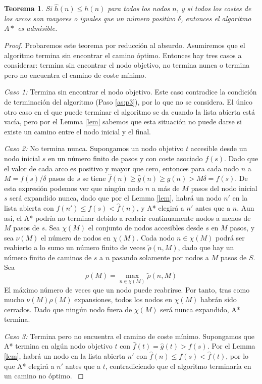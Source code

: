 \documentclass[a4paper,12pt]{article}
\newtheorem{thm}{Teorema}
\newenvironment{case1}{\textit{Caso 1:}}{}
\newenvironment{case2}{\textit{Caso 2:}}{}
\newenvironment{case3}{\textit{Caso 3:}}{}
\begin{document}
\begin{thm}\label{thm1}
Si $\hat{h}(n) \leq h(n)$ para todos los nodos $n$, y si todos los costes de los arcos son mayores o iguales que un número positivo $\delta$, entonces el algoritmo $A*$ es admisible.
\end{thm}

\begin{proof}
Probaremos este teorema por reducción al absurdo. Asumiremos que el algoritmo termina sin encontrar el camino óptimo. Entonces hay tres casos a considerar: termina sin encontrar el nodo objetivo, no termina nunca o termina pero no encuentra el camino de coste mínimo.

\begin{case1}
    Termina sin encontrar el nodo objetivo. Este caso contradice la condición de terminación del algoritmo (Paso \ref{as:p3}), por lo que no se considera. El único otro caso en el que puede terminar el algoritmo se da cuando la lista abierta está vacía, pero por el Lemma \ref{lem} sabemos que esta situación no puede darse si existe un camino entre el nodo inicial y el final.
\end{case1}

\begin{case2}
    No termina nunca. Supongamos un nodo objetivo $t$ accesible desde un nodo inicial $s$ en un número finito de pasos y con coste asociado $f(s)$. Dado que el valor de cada arco es positivo y mayor que cero, entonces para cada nodo $n$ a $M=f(s)/\delta$ pasos de $s$ se tiene $\hat{f}(n) \geq \hat{g}(n) \geq g(n) > M\delta = f(s)$. De esta expresión podemos ver que ningún nodo $n$ a más de $M$ pasos del nodo inicial $s$ será expandido nunca, dado que por el Lemma \ref{lem}, habrá un nodo $n'$ en la lista abierta con $\hat{f}(n') \leq f(s) < \hat{f}(n)$, y A* elegirá a $n'$ antes que a $n$. Aun así, el A* podría no terminar debido a reabrir continuamente nodos a menos de $M$ pasos de $s$. Sea $\chi(M)$ el conjunto de nodos accesibles desde $s$ en $M$ pasos, y sea $\nu(M)$ el número de nodos en $\chi(M)$. Cada nodo $n\in\chi(M)$ podrá ser reabierto a lo sumo un número finito de veces $\tilde{\rho}(n, M)$, dado que hay un número finito de caminos de $s$ a $n$ pasando solamente por nodos a $M$ pasos de $S$. Sea
    $$\rho(M) = \max_{n\in\chi(M)}\tilde{\rho}(n, M)$$
    El máximo número de veces que un nodo puede reabrirse. Por tanto, tras como mucho $\nu(M)\rho(M)$ expansiones, todos los nodos en $\chi(M)$ habrán sido cerrados. Dado que ningún nodo fuera de $\chi(M)$ será nunca expandido, A* termina.
\end{case2}

\begin{case3}
    Termina pero no encuentra el camino de coste mínimo. Supongamos que A* termina en algún nodo objetivo $t$ con $\hat{f}(t)=\hat{g}(t)> f(s)$. Por el Lemma \ref{lem}, habrá un nodo en la lista abierta $n'$ con $\hat{f}(n) \leq f(s) < \hat{f}(t)$, por lo que A* elegirá a $n'$ antes que a $t$, contradiciendo que el algoritmo terminaría en un camino no óptimo.
\end{case3}

\end{proof}
\end{document}
